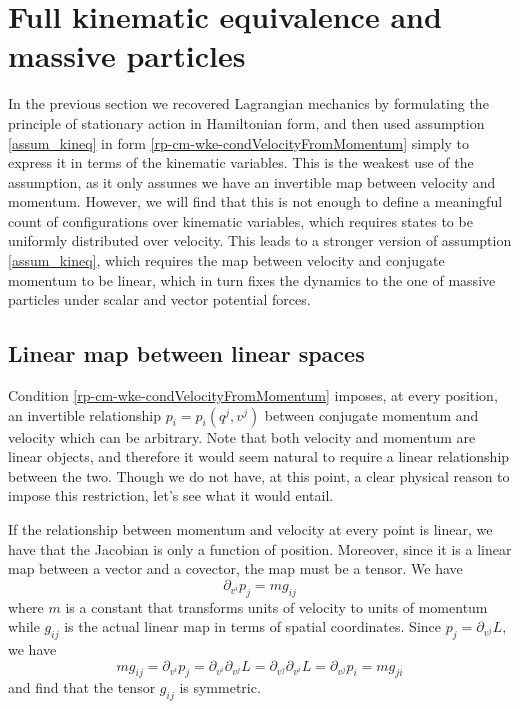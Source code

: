 \section{Full kinematic equivalence and massive particles}

In the previous section we recovered Lagrangian mechanics by formulating the principle of stationary action in Hamiltonian form, and then used assumption \ref{assum_kineq} in form \ref{rp-cm-wke-condVelocityFromMomentum} simply to express it in terms of the kinematic variables. This is the weakest use of the assumption, as it only assumes we have an invertible map between velocity and momentum. However, we will find that this is not enough to define a meaningful count of configurations over kinematic variables, which requires states to be uniformly distributed over velocity. This leads to a stronger version of assumption \ref{assum_kineq}, which requires the map between velocity and conjugate momentum to be linear, which in turn fixes the dynamics to the one of massive particles under scalar and vector potential forces.

\subsection{Linear map between linear spaces}

Condition \ref{rp-cm-wke-condVelocityFromMomentum} imposes, at every position, an invertible relationship $p_i = p_i(q^j, v^j)$ between conjugate momentum and velocity which can be arbitrary. Note that both velocity and momentum are linear objects, and therefore it would seem natural to require a linear relationship between the two. Though we do not have, at this point, a clear physical reason to impose this restriction, let's see what it would entail.

If the relationship between momentum and velocity at every point is linear, we have that the Jacobian is only a function of position. Moreover, since it is a linear map between a vector and a covector, the map must be a tensor. We have
\begin{equation}\label{rp-cm-lm-metricTensor}
	\partial_{v^i} p_j = m g_{ij}
\end{equation}
where $m$ is a constant that transforms units of velocity to units of momentum while $g_{ij}$ is the actual linear map in terms of spatial coordinates. Since $p_j = \partial_{v^j} L$, we have
\begin{equation}
	m g_{ij} = \partial_{v^i} p_j = \partial_{v^i} \partial_{v^j} L = \partial_{v^j} \partial_{v^i} L  = \partial_{v^j} p_i =  m g_{ji}
\end{equation}
and find that the tensor $g_{ij}$ is symmetric.

